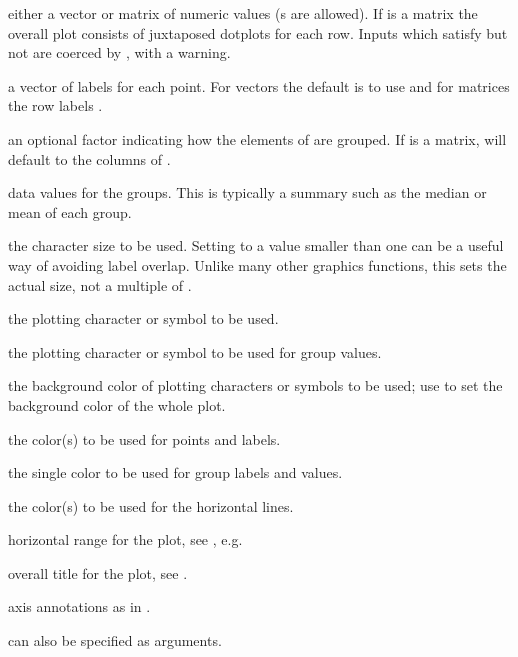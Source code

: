 %
\begin{Arguments}
\begin{ldescription}
\item[\code{x}] either a vector or matrix of numeric values (s are
allowed).  If  is a matrix the overall plot consists of
juxtaposed dotplots for each row.  Inputs which satisfy
 but not
 are coerced by
, with a warning.
\item[\code{labels}] a vector of labels for each point.
For vectors the default is to use  and for matrices
the row labels .
\item[\code{groups}] an optional factor indicating how the elements of
 are grouped.
If  is a matrix,  will default to the columns
of .
\item[\code{gdata}] data values for the groups.
This is typically a summary such as the median or mean
of each group.
\item[\code{cex}] the character size to be used.  Setting 
to a value smaller than one can be a useful way of avoiding label
overlap.  Unlike many other graphics functions, this sets the actual
size, not a multiple of .
\item[\code{pch}] the plotting character or symbol to be used.
\item[\code{gpch}] the plotting character or symbol to be used for group
values.
\item[\code{bg}] the background color of plotting characters or symbols to be
used; use  to set the background color of
the whole plot.
\item[\code{color}] the color(s) to be used for points and labels.
\item[\code{gcolor}] the single color to be used for group labels and
values.
\item[\code{lcolor}] the color(s) to be used for the horizontal lines.
\item[\code{xlim}] horizontal range for the plot, see
, e.g.
\item[\code{main}] overall title for the plot, see .
\item[\code{xlab, ylab}] axis annotations as in .
\item[\code{...}]  can also be specified as arguments.
\end{ldescription}
\end{Arguments}
